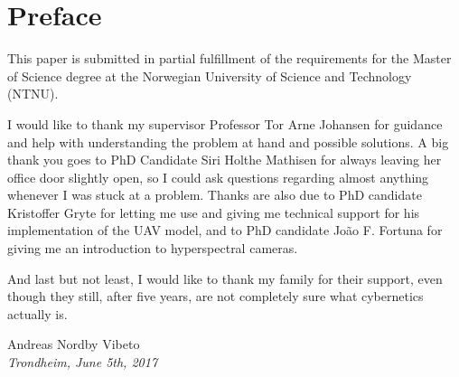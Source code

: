 \chapter*{Preface}

\vspace{1cm}

This paper is submitted in partial fulfillment of the requirements for the Master of Science degree at the Norwegian University of Science and Technology (NTNU).

I would like to thank my supervisor Professor Tor Arne Johansen for guidance and help with understanding the problem at hand and possible solutions. A big thank you goes to PhD Candidate Siri Holthe Mathisen for always leaving her office door slightly open, so I could ask questions regarding almost anything whenever I was stuck at a problem. Thanks are also due to PhD candidate Kristoffer Gryte for letting me use and giving me technical support for his implementation of the UAV model, and to PhD candidate João F. Fortuna for giving me an introduction to hyperspectral cameras.

And last but not least, I would like to thank my family for their support, even though they still, after five years, are not completely sure what cybernetics actually is.

\vspace{2cm}

\begin{center}
    Andreas Nordby Vibeto \\
    \emph{Trondheim, June 5th, 2017}
\end{center}